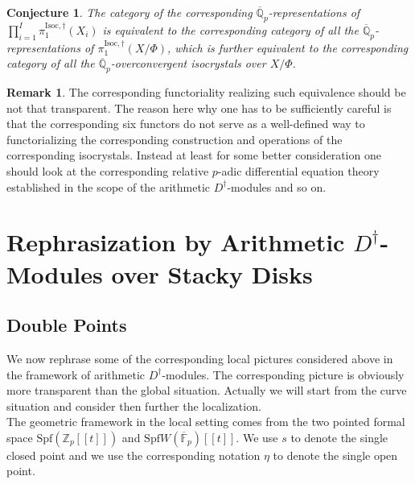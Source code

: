 \documentclass[11pt]{book}
\newtheorem{conjecture}[theorem]{Conjecture}
\theoremstyle{definition}
\newtheorem{remark}[theorem]{Remark}
\numberwithin{equation}{section}
\begin{document}
\begin{conjecture}
The category of the corresponding $\overline{\mathbb{Q}}_p$-representations of $\prod_{i=1}^I \pi^{\mathrm{Isoc},\dagger}_1(X_i)$ is equivalent to the corresponding category of all the $\overline{\mathbb{Q}}_p$-representations of $\pi^{\mathrm{Isoc},\dagger}_1(X/\Phi)$, which is further equivalent to the corresponding category of all the $\overline{\mathbb{Q}}_p$-overconvergent isocrystals over $X/\Phi$.
\end{conjecture}




\begin{remark}
The corresponding functoriality realizing such equivalence should be not that transparent. The reason here why one has to be sufficiently careful is that the corresponding six functors do not serve as a well-defined way to functorializing the corresponding construction and operations of the corresponding isocrystals. Instead at least for some better consideration one should look at the corresponding relative $p$-adic differential equation theory established in the scope of the	arithmetic $D^\dagger$-modules and so on.
\end{remark}




\newpage



\section{Rephrasization by Arithmetic $D^\dagger$-Modules over Stacky Disks}

\subsection{Double Points}

\indent We now rephrase some of the corresponding local pictures considered above in the framework of arithmetic $D^\dagger$-modules. The corresponding picture is obviously more transparent than the global situation. Actually we will start from the curve situation and consider then further the localization.\\


\indent The geometric framework in the local setting comes from the two pointed formal space $\mathrm{Spf}(\mathbb{Z}_p[[t]])$ and $\mathrm{Spf}W(\overline{\mathbb{F}}_p)[[t]]$. We use $s$ to denote the single closed point and we use the corresponding notation $\eta$ to denote the single open point. 
\end{document}
